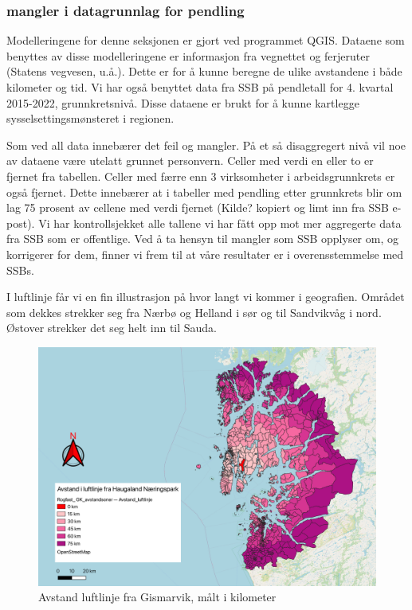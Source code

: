 \documentclass[
]{article}
\begin{document}
\hypertarget{mangler-i-datagrunnlag-for-pendling}{%
\subsubsection{mangler i datagrunnlag for
pendling}\label{mangler-i-datagrunnlag-for-pendling}}

Modelleringene for denne seksjonen er gjort ved programmet QGIS. Dataene
som benyttes av disse modelleringene er informasjon fra vegnettet og
ferjeruter (Statens vegvesen, u.å.). Dette er for å kunne beregne de
ulike avstandene i både kilometer og tid. Vi har også benyttet data fra
SSB på pendletall for 4. kvartal 2015-2022, grunnkretsnivå. Disse
dataene er brukt for å kunne kartlegge sysselsettingsmønsteret i
regionen.

Som ved all data innebærer det feil og mangler. På et så disaggregert
nivå vil noe av dataene være utelatt grunnet personvern. Celler med
verdi en eller to er fjernet fra tabellen. Celler med færre enn 3
virksomheter i arbeidsgrunnkrets er også fjernet. Dette innebærer at i
tabeller med pendling etter grunnkrets blir om lag 75 prosent av cellene
med verdi fjernet (Kilde? kopiert og limt inn fra SSB e-post). Vi har
kontrollsjekket alle tallene vi har fått opp mot mer aggregerte data fra
SSB som er offentlige. Ved å ta hensyn til mangler som SSB opplyser om,
og korrigerer for dem, finner vi frem til at våre resultater er i
overensstemmelse med SSBs.

I luftlinje får vi en fin illustrasjon på hvor langt vi kommer i
geografien. Området som dekkes strekker seg fra Nærbø og Helland i sør
og til Sandvikvåg i nord. Østover strekker det seg helt inn til Sauda.

\begin{figure}[H]

{\centering \includegraphics{bilder/Avstand_luftlinje.png}

}

\caption{\label{fig-avst-luft}Avstand luftlinje fra Gismarvik, målt i
kilometer}

\end{figure}
\end{document}

